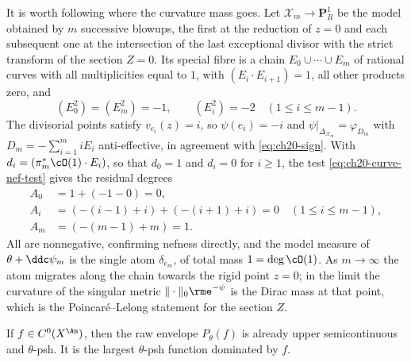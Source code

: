 \begin{example}
It is worth following where the curvature mass goes.  Let
$\mathcal X_m\to\mathbf P^1_R$ be the model obtained by $m$ successive
blowups, the first at the reduction of $z=0$ and each subsequent one at the intersection of the last exceptional divisor with the strict
transform of the section $Z=0$.  Its special fibre is a
chain $E_0\cup\cdots\cup E_m$ of rational curves with all multiplicities
equal to $1$, with $(E_i\cdot E_{i+1})=1$, all other products zero, and
\[
 (E_0^2)=(E_m^2)=-1,\qquad (E_i^2)=-2\quad(1\leq i\leq m-1).
\]
The divisorial points satisfy $v_{e_i}(z)=i$, so
$\psi(e_i)=-i$ and $\psi|_{\Delta_{\mathcal X_m}}=\varphi_{D_m}$ with
$D_m=-\sum_{i=1}^m iE_i$ anti-effective, in agreement with
\eqref{eq:ch20-sign}.  With $d_i=(\pi_m^*\cO(1)\cdot E_i)$, so that
$d_0=1$ and $d_i=0$ for $i\geq1$, the test
\eqref{eq:ch20-curve-nef-test} gives the residual degrees
\[
 \begin{aligned}
 A_0&=1+(-1-0)=0,\\
 A_i&=(-(i-1)+i)+(-(i+1)+i)=0\quad(1\leq i\leq m-1),\\
 A_m&=(-(m-1)+m)=1.
 \end{aligned}
\]
All are nonnegative, confirming nefness directly, and the model measure of
$\theta+\ddc\psi_m$ is the single atom $\delta_{e_m}$, of total mass
$1=\deg\cO(1)$.  As $m\to\infty$ the atom migrates along the chain
towards the rigid point $z=0$; in the limit the curvature of the singular
metric $\|\cdot\|_0\rme^{-\psi}$ is the Dirac mass at that point, which is
the Poincar\'e--Lelong statement for the section $Z$.
\end{example}

\begin{corollary}\label{cor:ch23-continuous-obstacle-psh}
If $f\in C^0(X^{\An})$, then the raw envelope $P_\theta(f)$ is already
upper semicontinuous and $\theta$-psh.  It is the largest
$\theta$-psh function dominated by $f$.
\end{corollary}

